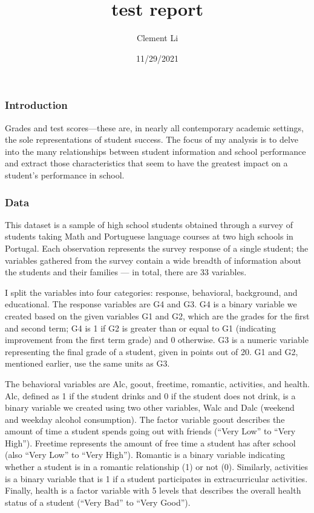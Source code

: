 \documentclass[
]{article}
\title{test report}
\author{Clement Li}
\date{11/29/2021}
\begin{document}
\maketitle

\hypertarget{introduction}{%
\subsubsection{Introduction}\label{introduction}}

Grades and test scores---these are, in nearly all contemporary academic
settings, the sole representations of student success. The focus of my
analysis is to delve into the many relationships between student
information and school performance and extract those characteristics
that seem to have the greatest impact on a student's performance in
school.

\hypertarget{data}{%
\subsubsection{Data}\label{data}}

This dataset is a sample of high school students obtained through a
survey of students taking Math and Portuguese language courses at two
high schools in Portugal. Each observation represents the survey
response of a single student; the variables gathered from the survey
contain a wide breadth of information about the students and their
families --- in total, there are 33 variables.

I split the variables into four categories: response, behavioral,
background, and educational. The response variables are G4 and G3. G4 is
a binary variable we created based on the given variables G1 and G2,
which are the grades for the first and second term; G4 is 1 if G2 is
greater than or equal to G1 (indicating improvement from the first term
grade) and 0 otherwise. G3 is a numeric variable representing the final
grade of a student, given in points out of 20. G1 and G2, mentioned
earlier, use the same units as G3.

The behavioral variables are Alc, goout, freetime, romantic, activities,
and health. Alc, defined as 1 if the student drinks and 0 if the student
does not drink, is a binary variable we created using two other
variables, Walc and Dalc (weekend and weekday alcohol consumption). The
factor variable goout describes the amount of time a student spends
going out with friends (``Very Low'' to ``Very High''). Freetime
represents the amount of free time a student has after school (also
``Very Low'' to ``Very High''). Romantic is a binary variable indicating
whether a student is in a romantic relationship (1) or not (0).
Similarly, activities is a binary variable that is 1 if a student
participates in extracurricular activities. Finally, health is a factor
variable with 5 levels that describes the overall health status of a
student (``Very Bad'' to ``Very Good'').
\end{document}
